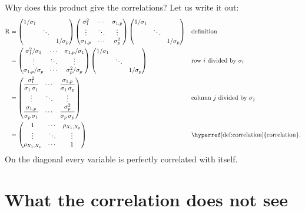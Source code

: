 \documentclass[a4paper,12pt,oneside]{report}
\begin{document}
Why does this product give the correlations? Let us write it out:
\begin{align*}
\mathrm{R}
&=\begin{pmatrix}
1/\sigma_1&&\\
&\ddots&\\
&&1/\sigma_p
\end{pmatrix}
\begin{pmatrix}
\sigma_1^2&\cdots&\sigma_{1,p}\\
\vdots&\ddots&\vdots\\
\sigma_{1,p}&\cdots&\sigma_p^2
\end{pmatrix}
\begin{pmatrix}
1/\sigma_1&&\\
&\ddots&\\
&&1/\sigma_p
\end{pmatrix}
&&\text{definition}\\
&=\begin{pmatrix}
\sigma_1^2/\sigma_1&\cdots&\sigma_{1,p}/\sigma_1\\
\vdots&\ddots&\vdots\\
\sigma_{1,p}/\sigma_p&\cdots&\sigma_p^2/\sigma_p
\end{pmatrix}
\begin{pmatrix}
1/\sigma_1&&\\
&\ddots&\\
&&1/\sigma_p
\end{pmatrix}
&&\text{row $i$ divided by $\sigma_i$}\\
&=\begin{pmatrix}
\dfrac{\sigma_1^2}{\sigma_1\,\sigma_1}&\cdots&\dfrac{\sigma_{1,p}}{\sigma_1\,\sigma_p}\\
\vdots&\ddots&\vdots\\
\dfrac{\sigma_{1,p}}{\sigma_p\,\sigma_1}&\cdots&\dfrac{\sigma_p^2}{\sigma_p\,\sigma_p}
\end{pmatrix}
&&\text{column $j$ divided by $\sigma_j$}\\
&=\begin{pmatrix}
1&\cdots&\rho_{X_1,X_p}\\
\vdots&\ddots&\vdots\\
\rho_{X_1,X_p}&\cdots&1
\end{pmatrix}
&&\text{\hyperref[def:correlation]{correlation}.}
\end{align*}
On the diagonal every variable is perfectly correlated with itself.

\section{What the correlation does not see}\label{sec:corr-limits}
\end{document}
